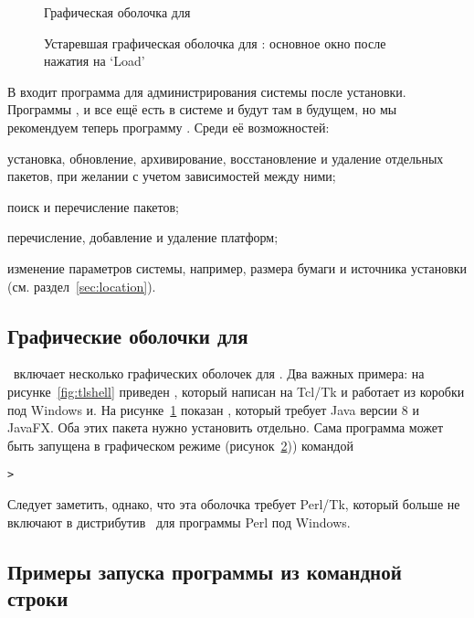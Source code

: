 \documentclass{article}
\begin{document}
\begin{figure}[tb]
\caption{Графическая оболочка  для }
\label{fig:tlcockpit}
\end{figure}

\begin{figure}[tb]
\caption{Устаревшая графическая оболочка для : основное
  окно после нажатия на `Load'}
\label{fig:tlmgr-gui}
\end{figure}


В \TL{} входит программа  для администрирования системы
после установки.  Программы ,  и
 все ещё есть в системе и будут там в будущем, но
мы рекомендуем теперь программу .  Среди её возможностей:
\begin{itemize*}
\item установка, обновление, архивирование, восстановление и удаление
  отдельных пакетов, при желании с учетом зависимостей между ними;
\item поиск и перечисление пакетов;
\item перечисление, добавление и удаление платформ;
\item изменение параметров системы, например, размера бумаги и
  источника установки (см. раздел~\ref{sec:location}).
\end{itemize*}

\subsection{Графические оболочки для }

\TL\ включает несколько графических оболочек для .  Два
важных примера: на рисунке~\ref{fig:tlshell} приведен
, который написан на Tcl/Tk и работает из коробки под
Windows и\MacOSX.  На рисунке~\ref{fig:tlcockpit} показан
, который требует Java версии 8 и JavaFX.  Оба этих
пакета нужно установить отдельно.  Сама программа  может
быть запущена в графическом режиме (рисунок~\ref{fig:tlmgr-gui}))
командой
\begin{alltt}
> 
\end{alltt}
Следует заметить, однако, что эта оболочка требует Perl/Tk, который
больше не включают в дистрибутив \TL\ для программы Perl под Windows.




\subsection{Примеры запуска программы  из командной строки}
\end{document}
